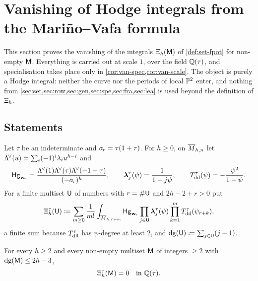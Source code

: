 \newcommand{\vanket}[1]{\lvert #1\rangle}
\newcommand{\vanbra}[1]{\langle #1\rvert}
\newcommand{\vanFock}{\mathscr{H}}             %
\newcommand{\vanOp}{\mathsf{Op}}               %
\newcommand{\vanS}{\mathbb{S}}                 %
\newcommand{\vanA}{\mathsf{A}_{\mathrm{c}}}    %

\section{Vanishing of Hodge integrals from the Mari\~no--Vafa formula}
\label{sec:van}

This section proves the vanishing of the integrals $\Xi_h(\mathsf{M})$ of \cref{def:set-fpot} for non-empty $\mathsf{M}$. Everything is carried out at scale $1$, over the field $\mathbb{Q}(\tau)$, and specialisation takes place only in \cref{cor:van-spec,cor:van-scale}. The object is purely a Hodge integral: neither the curve nor the periods of local $\mathbb{P}^2$ enter, and nothing from \cref{sec:set,sec:row,sec:gen,sec:spe,sec:fra,sec:lea} is used beyond the definition of $\Xi_h$.

\subsection{Statements}
\label{sec:van-statements}

Let $\tau$ be an indeterminate and $\sigma_{\!\tau}=\tau(1+\tau)$. For $h\geq 0$, on $\overline{M}_{h,n}$ let $\Lambda^{\!\vee}(u)=\sum_i(-1)^i\lambda_i u^{h-i}$ and
\[
\mathsf{Hg}_{\mathbf{w}_{\!\tau}}=\frac{\Lambda^{\!\vee}(1)\Lambda^{\!\vee}(\tau)\Lambda^{\!\vee}(-1-\tau)}{(-\sigma_{\!\tau})^h},\qquad
\boldsymbol{\lambda}^{\tau}_j(\psi)=\frac{1}{1-j\psi},\qquad
T_{\mathrm{dil}}^{\tau}(\psi)=-\frac{\psi^2}{1-\psi}.
\]
For a finite multiset $\mathsf{U}$ of numbers with $r=\#\mathsf{U}$ and $2h-2+r>0$ put
\begin{equation}\label{eq:van-Xi}
\Xi^{\tau}_h(\mathsf{U})\coloneqq\sum_{m\geq 0}\frac{1}{m!}\int_{\overline{M}_{h,r+m}}\mathsf{Hg}_{\mathbf{w}_{\!\tau}}\prod_{j\in\mathsf{U}}\boldsymbol{\lambda}^{\tau}_j(\psi)\prod_{k=1}^mT_{\mathrm{dil}}^{\tau}(\psi_{r+k}),
\end{equation}
a finite sum because $T_{\mathrm{dil}}^{\tau}$ has $\psi$-degree at least $2$, and $\mathrm{dg}(\mathsf{U})\coloneqq\sum_{j\in\mathsf{U}}(j-1)$.

\begin{thm}\label{thm:van-main}
For every $h\geq 2$ and every non-empty multiset $\mathsf{M}$ of integers $\geq 2$ with $\mathrm{dg}(\mathsf{M})\leq 2h-3$,
\[
\Xi^{\tau}_h(\mathsf{M})=0\quad\text{in }\mathbb{Q}(\tau).
\]
\end{thm}

